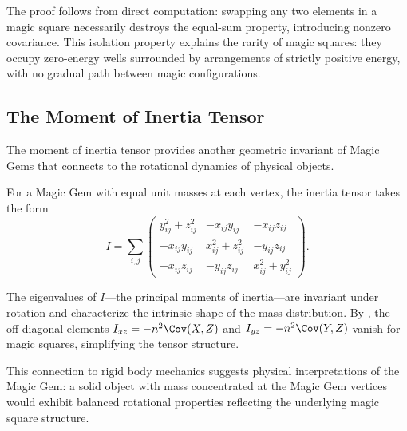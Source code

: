 The proof follows from direct computation: swapping any two elements in a magic square 
necessarily destroys the equal-sum property, introducing nonzero covariance.
This isolation property explains the rarity of magic squares:
they occupy zero-energy wells surrounded by arrangements of strictly positive energy,
with no gradual path between magic configurations.

\subsection{The Moment of Inertia Tensor}
\label{sec:inertia}

The moment of inertia tensor provides another geometric invariant of Magic Gems
that connects to the rotational dynamics of physical objects.

For a Magic Gem with equal unit masses at each vertex, the inertia tensor takes the form
\[
I = \sum_{i,j} \begin{pmatrix}
y_{ij}^2 + z_{ij}^2 & -x_{ij}y_{ij} & -x_{ij}z_{ij} \\
-x_{ij}y_{ij} & x_{ij}^2 + z_{ij}^2 & -y_{ij}z_{ij} \\
-x_{ij}z_{ij} & -y_{ij}z_{ij} & x_{ij}^2 + y_{ij}^2
\end{pmatrix}.
\]

The eigenvalues of $I$---the principal moments of inertia---are invariant under rotation
and characterize the intrinsic shape of the mass distribution.
By , the off-diagonal elements $I_{xz} = -n^2 \Cov(X,Z)$ and $I_{yz} = -n^2 \Cov(Y,Z)$ 
vanish for magic squares, simplifying the tensor structure.

This connection to rigid body mechanics suggests physical interpretations of the Magic Gem:
a solid object with mass concentrated at the Magic Gem vertices would exhibit balanced rotational properties
reflecting the underlying magic square structure.
